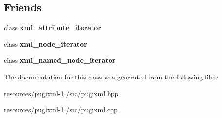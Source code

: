 \subsection*{Friends}
\begin{DoxyCompactItemize}
\item 
\hypertarget{classpugi_1_1xml__node_aeff34dec57ee910e3344631528969539}{class {\bfseries xml\+\_\+attribute\+\_\+iterator}}\label{classpugi_1_1xml__node_aeff34dec57ee910e3344631528969539}

\item 
\hypertarget{classpugi_1_1xml__node_aa25e28e29a8cec4daa60cdd2d5934757}{class {\bfseries xml\+\_\+node\+\_\+iterator}}\label{classpugi_1_1xml__node_aa25e28e29a8cec4daa60cdd2d5934757}

\item 
\hypertarget{classpugi_1_1xml__node_a1e60ab2fa6d6adb56f4b833761fc0b66}{class {\bfseries xml\+\_\+named\+\_\+node\+\_\+iterator}}\label{classpugi_1_1xml__node_a1e60ab2fa6d6adb56f4b833761fc0b66}

\end{DoxyCompactItemize}


The documentation for this class was generated from the following files\+:\begin{DoxyCompactItemize}
\item 
resources/pugixml-\/1./src/pugixml.\+hpp\item 
resources/pugixml-\/1./src/pugixml.\+cpp\end{DoxyCompactItemize}
